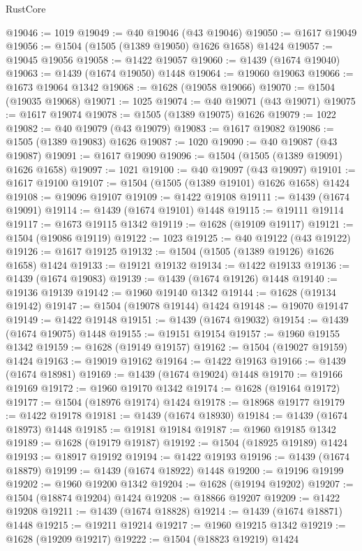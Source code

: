 \begin{lexlean}{RustCore}
\begin{coremodule}
@19046 := 1019
@19049 := @40 @19046 (@43 @19046)
@19050 := @1617 @19049
@19056 := @1504 (@1505 (@1389 @19050) @1626 @1658) @1424
@19057 := @19045 @19056
@19058 := @1422 @19057
@19060 := @1439 (@1674 @19040)
@19063 := @1439 (@1674 @19050) @1448
@19064 := @19060 @19063
@19066 := @1673 @19064 @1342
@19068 := @1628 (@19058 @19066)
@19070 := @1504 (@19035 @19068)
@19071 := 1025
@19074 := @40 @19071 (@43 @19071)
@19075 := @1617 @19074
@19078 := @1505 (@1389 @19075) @1626
@19079 := 1022
@19082 := @40 @19079 (@43 @19079)
@19083 := @1617 @19082
@19086 := @1505 (@1389 @19083) @1626
@19087 := 1020
@19090 := @40 @19087 (@43 @19087)
@19091 := @1617 @19090
@19096 := @1504 (@1505 (@1389 @19091) @1626 @1658)
@19097 := 1021
@19100 := @40 @19097 (@43 @19097)
@19101 := @1617 @19100
@19107 := @1504 (@1505 (@1389 @19101) @1626 @1658) @1424
@19108 := @19096 @19107
@19109 := @1422 @19108
@19111 := @1439 (@1674 @19091)
@19114 := @1439 (@1674 @19101) @1448
@19115 := @19111 @19114
@19117 := @1673 @19115 @1342
@19119 := @1628 (@19109 @19117)
@19121 := @1504 (@19086 @19119)
@19122 := 1023
@19125 := @40 @19122 (@43 @19122)
@19126 := @1617 @19125
@19132 := @1504 (@1505 (@1389 @19126) @1626 @1658) @1424
@19133 := @19121 @19132
@19134 := @1422 @19133
@19136 := @1439 (@1674 @19083)
@19139 := @1439 (@1674 @19126) @1448
@19140 := @19136 @19139
@19142 := @1960 @19140 @1342
@19144 := @1628 (@19134 @19142)
@19147 := @1504 (@19078 @19144) @1424
@19148 := @19070 @19147
@19149 := @1422 @19148
@19151 := @1439 (@1674 @19032)
@19154 := @1439 (@1674 @19075) @1448
@19155 := @19151 @19154
@19157 := @1960 @19155 @1342
@19159 := @1628 (@19149 @19157)
@19162 := @1504 (@19027 @19159) @1424
@19163 := @19019 @19162
@19164 := @1422 @19163
@19166 := @1439 (@1674 @18981)
@19169 := @1439 (@1674 @19024) @1448
@19170 := @19166 @19169
@19172 := @1960 @19170 @1342
@19174 := @1628 (@19164 @19172)
@19177 := @1504 (@18976 @19174) @1424
@19178 := @18968 @19177
@19179 := @1422 @19178
@19181 := @1439 (@1674 @18930)
@19184 := @1439 (@1674 @18973) @1448
@19185 := @19181 @19184
@19187 := @1960 @19185 @1342
@19189 := @1628 (@19179 @19187)
@19192 := @1504 (@18925 @19189) @1424
@19193 := @18917 @19192
@19194 := @1422 @19193
@19196 := @1439 (@1674 @18879)
@19199 := @1439 (@1674 @18922) @1448
@19200 := @19196 @19199
@19202 := @1960 @19200 @1342
@19204 := @1628 (@19194 @19202)
@19207 := @1504 (@18874 @19204) @1424
@19208 := @18866 @19207
@19209 := @1422 @19208
@19211 := @1439 (@1674 @18828)
@19214 := @1439 (@1674 @18871) @1448
@19215 := @19211 @19214
@19217 := @1960 @19215 @1342
@19219 := @1628 (@19209 @19217)
@19222 := @1504 (@18823 @19219) @1424

\end{coremodule}
\end{lexlean}
